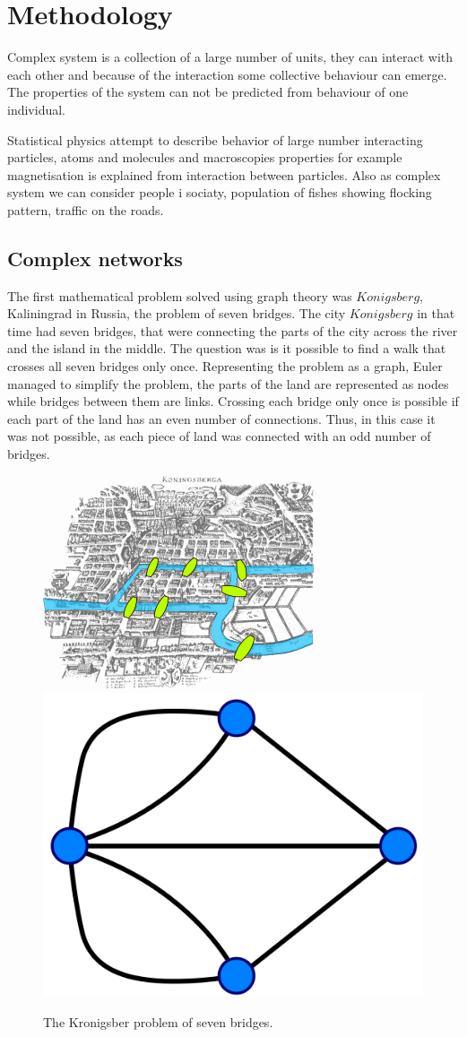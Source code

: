 \chapter{Methodology} %


Complex system is a collection of a large number of units, they can interact with each other and because of the interaction some collective behaviour can emerge. The properties of the system can not be predicted from behaviour of one individual. 

Statistical physics attempt to describe behavior of large number interacting particles, atoms and molecules and macroscopies properties for example magnetisation is explained from interaction between particles. Also as complex system we can consider people i sociaty, population of fishes showing flocking pattern, traffic on the roads. 



\section{Complex networks}

The first mathematical problem solved using graph theory was $Konigsberg$, Kaliningrad in Russia, the problem of seven bridges. The city $Konigsberg$ in that time had seven bridges, that were connecting the parts of the city across the river and the island in the middle. The question was is it possible to find a walk that crosses all seven bridges only once. Representing the problem as a graph, Euler managed to simplify the problem, the parts of the land are represented as nodes while bridges between them are links. Crossing each bridge only once is possible if each part of the land has an even number of connections. Thus, in this case it was not possible, as each piece of land was connected with an odd number of bridges.



\begin{figure}[h!]
	\centering
	\includegraphics[width=0.3\linewidth]{Figures/Konigsberg_bridges.png} \hspace{2cm}
	\includegraphics[width=0.3\linewidth]{Figures/Konigsberg_graph.png}
	\caption{The Kronigsber problem of seven bridges.}
	\label{fig:Krgraph}
\end{figure}

